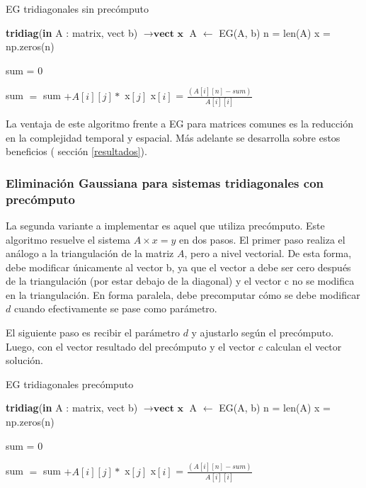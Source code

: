  \begin{algorithm}
\caption{EG tridiagonales sin precómputo}
\begin{algorithmic}
\State \textbf{tridiag}(\textbf{in} A : matrix, vect b) $\to \textbf{vect x}$
 \State A $\gets$ EG(A, b) 
\State n = len(A)
\State x = np.zeros(n)

        \State sum = 0
        
                \State sum $=$ sum $+ A[i][j] *$ x$[j]$
             \EndIf       
            \State x$[i]$ = $\frac{(A[i][n] - sum)}{A[i][i]}$
        \EndFor
   \EndFor
{}
\end{algorithmic}
\end{algorithm}

La ventaja de este algoritmo frente a EG para matrices comunes es la reducción en la complejidad temporal y espacial. Más adelante se desarrolla sobre estos beneficios ( sección \ref{resultados}).

\subsubsection{Eliminación Gaussiana para sistemas tridiagonales con precómputo}

La segunda variante a implementar es aquel que utiliza precómputo. Este algoritmo resuelve el sistema $A \times x = y$ en dos pasos. 
El primer paso realiza el análogo a la triangulación de la matriz $A$, pero a nivel vectorial. De esta forma, debe modificar únicamente al vector b, ya que el vector a debe ser cero después de la triangulación (por estar debajo de la diagonal) y el vector c no se modifica en la triangulación. En forma paralela, debe precomputar cómo se debe modificar $d$ cuando efectivamente se pase como parámetro.

El siguiente paso es recibir el parámetro $d$ y ajustarlo según el precómputo. Luego, con el vector resultado del precómputo y el vector $c$ calculan el vector solución.

\begin{algorithm}
\caption{EG tridiagonales precómputo}\label{tridiagonal_prec}
\begin{algorithmic}
\State \textbf{tridiag}(\textbf{in} A : matrix, vect b) $\to \textbf{vect x}$
 \State A $\gets$ EG(A, b) 
\State n = len(A)
\State x = np.zeros(n)

        \State sum = 0
        
                \State sum $=$ sum $+ A[i][j] *$ x$[j]$
             \EndIf       
            \State x$[i]$ = $\frac{(A[i][n] - sum)}{A[i][i]}$
        \EndFor
   \EndFor
{}
\end{algorithmic}
\end{algorithm}


